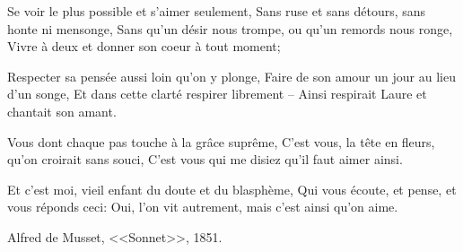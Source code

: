 \documentclass[12pt,a4paper]{article}
\begin{document}
Se voir le plus possible et s'aimer seulement,
Sans ruse et sans détours, sans honte ni mensonge,
Sans qu'un désir nous trompe, ou qu'un remords nous ronge,
Vivre à deux et donner son coeur à tout moment;


Respecter sa pensée aussi loin qu'on y plonge, 
Faire de son amour un jour au lieu d'un songe,
Et dans cette clarté respirer librement –
Ainsi respirait Laure et chantait son amant.


Vous dont chaque pas touche à la grâce suprême,
C'est vous, la tête en fleurs, qu'on croirait sans souci,
C'est vous qui me disiez qu'il faut aimer ainsi.


Et c'est moi, vieil enfant du doute et du blasphème,
Qui vous écoute, et pense, et vous réponds ceci:
Oui, l'on vit autrement, mais c'est ainsi qu'on aime.

Alfred de Musset, <<Sonnet>>, 1851.
\end{document}
